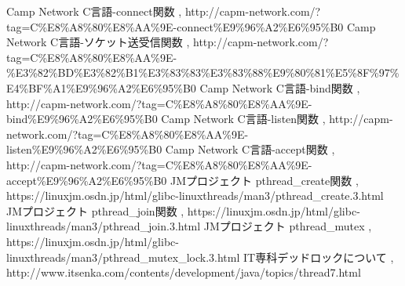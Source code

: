 \documentclass[a4j]{celb-report}
\begin{document}
\newpage
\begin{thebibliography}{9}

 Camp Network C言語-connect関数 , http://capm-network.com/?tag=C\%E8\%A8\%80\%E8\%AA\%9E-connect\%E9\%96\%A2\%E6\%95\%B0
 Camp Network C言語-ソケット送受信関数 , http://capm-network.com/?tag=C\%E8\%A8\%80\%E8\%AA\%9E-\%E3\%82\%BD\%E3\%82\%B1\%E3\%83\%83\%E3\%83\%88\%E9\%80\%81\%E5\%8F\%97\%E4\%BF\%A1\%E9\%96\%A2\%E6\%95\%B0
 Camp Network C言語-bind関数 , http://capm-network.com/?tag=C\%E8\%A8\%80\%E8\%AA\%9E-bind\%E9\%96\%A2\%E6\%95\%B0
 Camp Network C言語-listen関数 , http://capm-network.com/?tag=C\%E8\%A8\%80\%E8\%AA\%9E-listen\%E9\%96\%A2\%E6\%95\%B0
 Camp Network C言語-accept関数 , http://capm-network.com/?tag=C\%E8\%A8\%80\%E8\%AA\%9E-accept\%E9\%96\%A2\%E6\%95\%B0
JMプロジェクト pthread\_create関数 , https://linuxjm.osdn.jp/html/glibc-linuxthreads/man3/pthread\_create.3.html
 JMプロジェクト pthread\_join関数 , https://linuxjm.osdn.jp/html/glibc-linuxthreads/man3/pthread\_join.3.html
 JMプロジェクト pthread\_mutex , https://linuxjm.osdn.jp/html/glibc-linuxthreads/man3/pthread\_mutex\_lock.3.html
 IT専科デッドロックについて , http://www.itsenka.com/contents/development/java/topics/thread7.html
\end{thebibliography}
%
\end{document}

